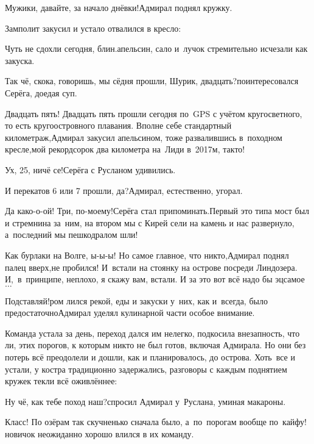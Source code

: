 \diagdash Мужики, давайте, за начало днёвки!\mdash Адмирал поднял кружку.


Замполит закусил и устало отвалился в кресло:

\diagdash Чуть не сдохли сегодня, блин.\mdash апельсин, сало и~лучок стремительно исчезали как закуска.

\diagdash Так чё, скока, говоришь, мы сёдня прошли, Шурик, двадцать?\mdash поинтересовался Серёга, доедая суп.

\diagdash Двадцать пять! Двадцать пять прошли сегодня по~GPS с учётом кругосветного, то есть кругоостровного плавания. Вполне себе стандартный километраж,\mdash Адмирал закусил апельсином, тоже развалившись в~походном кресле,\mdash мой рекорд\mdash сорок два километра на~Лиди в~2017\sdash м, так\sdash то!

\diagdash Ух, 25, ничё се!\mdash Серёга с Русланом удивились.

\diagdash И перекатов 6 или 7 прошли, да?\mdash Адмирал, естественно, угорал.

\diagdash Да како-о-ой! Три, по-моему!\mdash Серёга стал припоминать.\mdash Первый это типа мост был и стремнина за~ним, на втором мы с Кирей сели на камень и нас развернуло, а~последний мы пешкодралом шли!

\diagdash Как бурлаки на Волге, ы-ы-ы! Но самое главное, что никто,\mdash Адмирал поднял палец вверх,\mdash не пробился! И~встали на стоянку на острове посреди Линдозера. И,~в~принципе, неплохо, я скажу вам, встали. И за это вот всё надо бы эц\sdash самое$\ldots$

\diagdash Подставляй!\mdash ром лился рекой, еды и закуски у~них, как и~всегда, было предостаточно\mdash Адмирал уделял кулинарной части особое внимание.

Команда устала за день, переход дался им нелегко, подкосила внезапность, что ли, этих порогов, к которым никто не был готов, включая Адмирала. Но они без потерь всё преодолели и дошли, как и планировалось, до острова. Хоть~все и устали, у костра традиционно задержались, разговоры с каждым поднятием кружек текли всё оживлённее:

\diagdash Ну чё, как тебе поход наш?\mdash спросил Адмирал у~Руслана, уминая макароны.

\diagdash Класс! По озёрам так скучненько сначала было, а~по~порогам вообще по~кайфу!\mdash новичок неожиданно хорошо влился в их команду.

